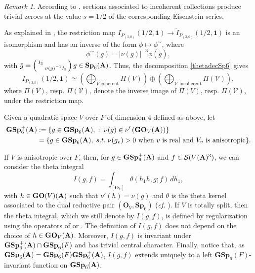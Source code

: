 \documentclass[11pt, reqno]{amsart}
\theoremstyle{plain}
\theoremstyle{definition}
\theoremstyle{remark}
\newtheorem{remark}[theorem]{Remark}
\theoremstyle{plain}
\def\A{{\bf A}}
\def\GSp{{\mathbf{GSp}}}
\def\Sp{{\mathbf{Sp}}}
\def\GO{{\mathbf{GO}}}
\begin{document}
\begin{remark}
According to \cite[p. 8 (ii)]{KudlaRallis}, sections associated to incoherent collections produce trivial zeroes at the value $s=1/2$ of the corresponding Eisenstein series. 
\end{remark}

As explained in \cite[p. 9]{KudlaHarrisJacquet}, the restriction map $I_{P_{(3,0)}}\left(1/2,\mathbf{1}\right) \to \tilde{I}_{P_{(3,0)}}\left(1/2,\mathbf{1}\right)$ is an isomorphism and has an inverse of the form $\phi \mapsto \phi^{\sim}$, where \[\phi^{\sim}(g) = |\nu(g)|^{-3}\phi(\tilde{g}),\] with $\tilde{g} = \left(\begin{smallmatrix}I_3 & \\ &\nu(g)^{-1}I_3\end{smallmatrix}\right)g\in \Sp_6(\A)$. Thus, the decomposition \eqref{thetadecSp6} gives
\[I_{P_{(3,0)}}\left(1/2,\mathbf{1}\right) \simeq \left(\bigoplus_{V\text{ coherent}} \Pi(V)\right)\oplus \left(\bigoplus_{\mathcal{V}\text{ incoherent}} \Pi(\mathcal{V})\right),\]
where $\Pi(V)$, resp. $\Pi(\mathcal{V})$, denote the inverse image of $\tilde{\Pi}(V)$, resp. $\tilde{\Pi}(\mathcal{V})$, under the restriction map.  

Given a quadratic space $V$ over $F$ of dimension $4$ defined as above, let 
\begin{align}\label{GSp6+def}\GSp_6^+(\A) &:= \{g\in \GSp_6(\A),\;:\;\nu(g)\in \nu' \left(\GO_V(\A)\right)\} \\&= \{g\in \GSp_6(\A),\;s.t.\;\nu(g_v)>0 \text{ when }v \text{ is real and }V_v\text{ is anisotropic}\}.\nonumber\end{align}

If $V$ is anisotropic over $F$, then, for $g \in \GSp_6^+(\A)$ and $f \in \mathcal{S}(V(\A)^3)$, we can consider the theta integral \[ I(g, f) = \int_{[\mathbf{O}_V]} \theta(h_1 h, g ; f)\, d h_1,\]
with $h \in \mathbf{GO}(V)(\A)$ such that $\nu'(h) = \nu(g)$ and $\theta$ is the theta kernel associated to the dual reductive pair $(\mathbf{O}_V,\Sp_6)$ (\emph{cf.} \cite[(3.7)]{KudlaRallis}). If $V$ is totally split, then the theta integral, which we still denote by $I(g, f)$, is defined by regularization using the operators of \cite[\S 5.1]{KudlaRallis} or \cite[\S 1]{IchinoSW}. The definition of $I(g, f)$ does not depend on the choice of $h \in \mathbf{GO}_V(\A)$. Moreover, 
$I(g, f)$ is invariant under $\GSp_6^+(\A) \cap \GSp_6(F)$ and has trivial central character. Finally, notice that, as $\GSp_6(\A) =\GSp_6(F) \GSp_6^+(\A)$, $I(g, f)$ extends uniquely to a left $\GSp_6(F)$-invariant function on $\GSp_6(\A)$. 
\end{document}
